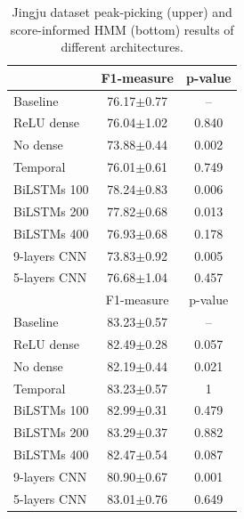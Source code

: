 \begin{table}[ht!]
\centering
\caption{Jingju dataset peak-picking (upper) and score-informed HMM (bottom) results of different architectures.}
\label{table:peak_picking_jingju_archi}
\begin{tabular}{l|cc}
\toprule
               & F1-measure & p-value \\
\midrule
Baseline     &76.17$\pm$0.77     & -- \\
ReLU dense     &76.04$\pm$1.02       & 0.840              \\
No dense       &73.88$\pm$0.44       & 0.002              \\
Temporal       &76.01$\pm$0.61       & 0.749              \\
BiLSTMs 100 &78.24$\pm$0.83       & 0.006              \\
BiLSTMs 200 &77.82$\pm$0.68       & 0.013              \\
BiLSTMs 400 &76.93$\pm$0.68       & 0.178              \\
9-layers CNN   &73.83$\pm$0.92        & 0.005              \\
5-layers CNN   &76.68$\pm$1.04         & 0.457             \\

\toprule
               & F1-measure & p-value \\
\midrule
Baseline     & 83.23$\pm$0.57     & --        \\  
ReLU dense     & 82.49$\pm$0.28        & 0.057              \\
No dense       & 82.19$\pm$0.44         & 0.021              \\
Temporal       & 83.23$\pm$0.57         & 1                  \\
BiLSTMs 100 & 82.99$\pm$0.31         & 0.479              \\
BiLSTMs 200 & 83.29$\pm$0.37         & 0.882              \\
BiLSTMs 400 & 82.47$\pm$0.54        & 0.087              \\
9-layers CNN   & 80.90$\pm$0.67         & 0.001              \\
5-layers CNN   & 83.01$\pm$0.76        & 0.649             \\
\bottomrule
\end{tabular}
\end{table}

